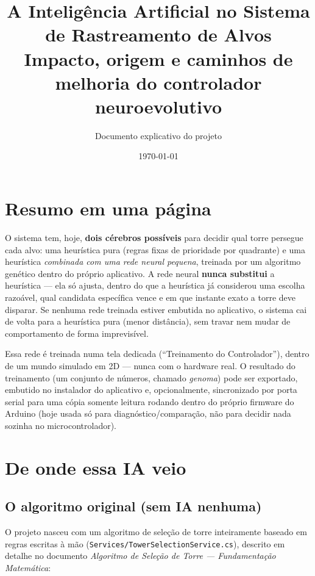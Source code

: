 \documentclass[11pt,a4paper]{article}
\title{\textbf{A Inteligência Artificial no Sistema de Rastreamento de Alvos}\\[0.3em]
\large Impacto, origem e caminhos de melhoria do controlador neuroevolutivo}
\author{Documento explicativo do projeto}
\date{\today}
\begin{document}
\maketitle
\thispagestyle{empty}

\tableofcontents
\newpage

\section{Resumo em uma página}

O sistema tem, hoje, \textbf{dois cérebros possíveis} para decidir qual torre persegue cada
alvo: uma heurística pura (regras fixas de prioridade por quadrante) e uma heurística
\emph{combinada com uma rede neural pequena}, treinada por um algoritmo genético dentro do
próprio aplicativo. A rede neural \textbf{nunca substitui} a heurística — ela só ajusta, dentro
do que a heurística já considerou uma escolha razoável, qual candidata específica vence e em
que instante exato a torre deve disparar. Se nenhuma rede treinada estiver embutida no
aplicativo, o sistema cai de volta para a heurística pura (menor distância), sem travar nem
mudar de comportamento de forma imprevisível.

Essa rede é treinada numa tela dedicada (``Treinamento do Controlador''), dentro de um mundo
simulado em 2D — nunca com o hardware real. O resultado do treinamento (um conjunto de números,
chamado \emph{genoma}) pode ser exportado, embutido no instalador do aplicativo e,
opcionalmente, sincronizado por porta serial para uma cópia somente leitura rodando dentro do
próprio firmware do Arduino (hoje usada só para diagnóstico/comparação, não para decidir nada
sozinha no microcontrolador).

\section{De onde essa IA veio}

\subsection{O algoritmo original (sem IA nenhuma)}

O projeto nasceu com um algoritmo de seleção de torre inteiramente baseado em regras escritas à
mão (\texttt{Services/TowerSelectionService.cs}), descrito em detalhe no documento
\textit{Algoritmo de Seleção de Torre — Fundamentação Matemática}:
\end{document}
